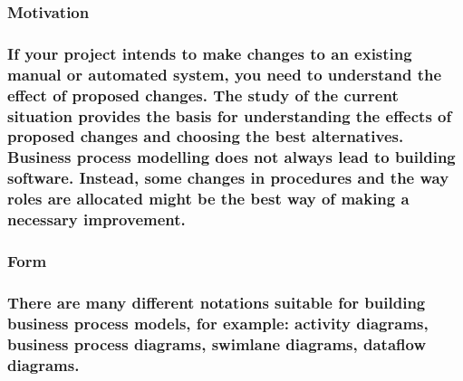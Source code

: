 \documentclass[
]{article}
\begin{document}
\hypertarget{motivation-22}{%
\subsubsection{Motivation}\label{motivation-22}}

\hypertarget{if-your-project-intends-to-make-changes-to-an-existing-manual-or-automated-system-you-need-to-understand-the-effect-of-proposed-changes.-the-study-of-the-current-situation-provides-the-basis-for-understanding-the-effects-of-proposed-changes-and-choosing-the-best-alternatives.-business-process-modelling-does-not-always-lead-to-building-software.-instead-some-changes-in-procedures-and-the-way-roles-are-allocated-might-be-the-best-way-of-making-a-necessary-improvement.}{%
\subsubsection{If your project intends to make changes to an existing
manual or automated system, you need to understand the effect of
proposed changes. The study of the current situation provides the basis
for understanding the effects of proposed changes and choosing the best
alternatives. Business process modelling does not always lead to
building software. Instead, some changes in procedures and the way roles
are allocated might be the best way of making a necessary
improvement.}\label{if-your-project-intends-to-make-changes-to-an-existing-manual-or-automated-system-you-need-to-understand-the-effect-of-proposed-changes.-the-study-of-the-current-situation-provides-the-basis-for-understanding-the-effects-of-proposed-changes-and-choosing-the-best-alternatives.-business-process-modelling-does-not-always-lead-to-building-software.-instead-some-changes-in-procedures-and-the-way-roles-are-allocated-might-be-the-best-way-of-making-a-necessary-improvement.}}

\hypertarget{form-20}{%
\subsubsection{Form}\label{form-20}}

\hypertarget{there-are-many-different-notations-suitable-for-building-business-process-models-for-example-activity-diagrams-business-process-diagrams-swimlane-diagrams-dataflow-diagrams.}{%
\subsubsection{There are many different notations suitable for building
business process models, for example: activity diagrams, business
process diagrams, swimlane diagrams, dataflow
diagrams.}\label{there-are-many-different-notations-suitable-for-building-business-process-models-for-example-activity-diagrams-business-process-diagrams-swimlane-diagrams-dataflow-diagrams.}}
\end{document}
